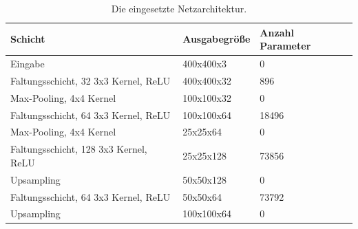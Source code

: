\begin{table}
    \centering
    \caption{Die eingesetzte Netzarchitektur.}
    \label{tab:netzarchitektur}
    \begin{tabular}{|l|l|l|}
        \hline

        \textbf{Schicht}                      & \textbf{Ausgabegr\"o{\ss}e} & \textbf{Anzahl Parameter} \\

        \hline

        Eingabe                               & 400x400x3                   & 0                         \\

        \hline

        Faltungsschicht, 32 3x3 Kernel, ReLU  & 400x400x32                  & 896                       \\

        \hline

        Max-Pooling, 4x4 Kernel               & 100x100x32                  & 0                         \\

        \hline

        Faltungsschicht, 64 3x3 Kernel, ReLU  & 100x100x64                  & 18496                     \\

        \hline

        Max-Pooling, 4x4 Kernel               & 25x25x64                    & 0                         \\

        \hline

        Faltungsschicht, 128 3x3 Kernel, ReLU & 25x25x128                   & 73856                     \\

        \hline

        Upsampling                            & 50x50x128                   & 0                         \\

        \hline

        Faltungsschicht, 64 3x3 Kernel, ReLU  & 50x50x64                    & 73792                     \\

        \hline

        Upsampling                            & 100x100x64                  & 0                         \\


\end{tabular}
\end{table}
